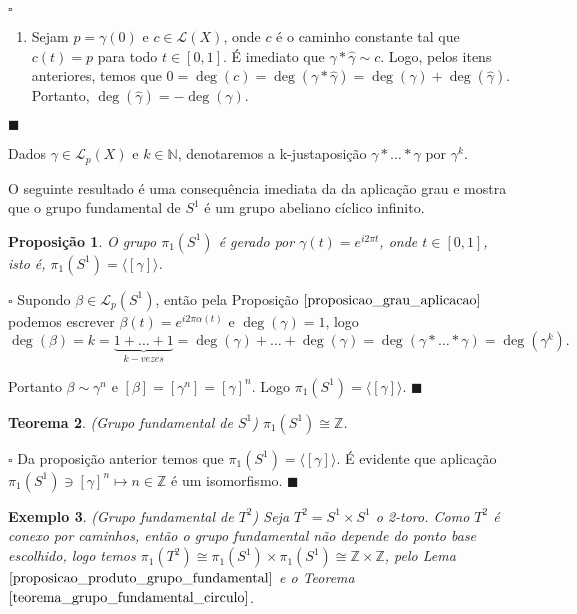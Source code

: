 \documentclass[12pt]{book}
\newtheorem{teorema}{Teorema}[section]
\newtheorem{exemplo}[teorema]{Exemplo}
\newtheorem{proposicao}[teorema]{Proposição}
\newenvironment{prova}[1]{$\square$ #1}{\hfill$\blacksquare$}
\newcommand{\caminhos}{\mathcal{L}}
\newcommand{\caminhossempontobase}[1]{\caminhos(#1)}
\newcommand{\caminhospontobasegeral}[2]{\caminhos_{#1}(#2)}
\newcommand{\circulo}{S^{1}}
\newcommand{\classe}[1]{[#1]}
\newcommand{\gerador}[1]{\langle #1\rangle}
\newcommand{\grupofundamental}[1]{\pi_{1}(#1)}
\newcommand{\inteiros}{\mathbb{Z}}
\newcommand{\intervalo}{[0,1]}
\begin{document}
\begin{prova}
\begin{enumerate}
			\item Sejam $p=\gamma(0)$ e $c\in \caminhossempontobase{X}$, onde $c$ é o caminho constante tal que $c(t)=p$ para todo $t\in \intervalo$. É imediato que $\gamma*\hat{\gamma}  \sim c$. Logo, pelos itens anteriores, temos que $0=\deg(c) = \deg(\gamma*\hat{\gamma} ) = \deg(\gamma) + \deg(\hat{\gamma} )$. Portanto, $\deg(\hat{\gamma} ) = -\deg(\gamma) $.
		\end{enumerate}
	\end{prova}
	
	Dados $\gamma \in \caminhospontobasegeral{p}{X}$ e $k \in \mathbb{N}$, denotaremos a k-justaposição $\gamma*\dots * \gamma$ por $\gamma^{k}$.
	
	O seguinte resultado é uma consequência imediata da da aplicação grau e mostra que o grupo fundamental de $\circulo$ é um grupo abeliano cíclico infinito.
	
	\begin{proposicao}\label{proposicao_gerador_grupo_fundamental_ciruclo}
		O grupo $\grupofundamental{\circulo}$ é gerado por $\gamma(t) = e^{i2\pi t}$, onde $t \in [0,1]$, isto é, $\grupofundamental{\circulo} = \gerador{\classe{\gamma}} $.
	\end{proposicao}
	\begin{prova}
		Supondo $\beta \in \caminhospontobasegeral{p}{\circulo}$, então pela Proposição $\ref{proposicao_grau_aplicacao}$ podemos escrever $\beta(t)=e^{i2\pi \alpha(t)}$ e $\deg(\gamma) = 1$, logo 
		$$
		\deg(\beta) = k = \underbrace{1+\dots+1}_{k-vezes} = \deg(\gamma)+\dots+\deg(\gamma) = \deg(\gamma *\dots *\gamma) = \deg(\gamma^{k}).
		$$
		
		Portanto $\beta \sim \gamma^{n}$ e $\classe{\beta} = \classe{\gamma^{n}}=\classe{\gamma}^{n}$. Logo $\grupofundamental{\circulo} = \gerador{\classe{\gamma}}$.
	\end{prova}
	
	\begin{teorema}\label{teorema_grupo_fundamental_circulo}
		(Grupo fundamental de $\circulo$) $\grupofundamental{\circulo} \cong \inteiros$.
	\end{teorema}
	\begin{prova}
		Da proposição anterior temos que $\grupofundamental{\circulo} = \gerador{\classe{\gamma}}$. É evidente que aplicação $\grupofundamental{\circulo}  \ni \classe{\gamma}^{n} \mapsto n \in \inteiros$ é um isomorfismo.
	\end{prova}
	
	
	\begin{exemplo}
		(Grupo fundamental de $T^{2}$) Seja $T^{2}=\circulo \times \circulo$ o 2-toro. Como $T^{2}$ é conexo por caminhos, então o grupo fundamental não depende do ponto base escolhido, logo temos $\grupofundamental{T^{2}} \cong \grupofundamental{\circulo} \times \grupofundamental{\circulo} \cong \inteiros \times \inteiros$, pelo Lema $\ref{proposicao_produto_grupo_fundamental}$ e o Teorema $\ref{teorema_grupo_fundamental_circulo}$. 
	\end{exemplo}
	
\end{document}
